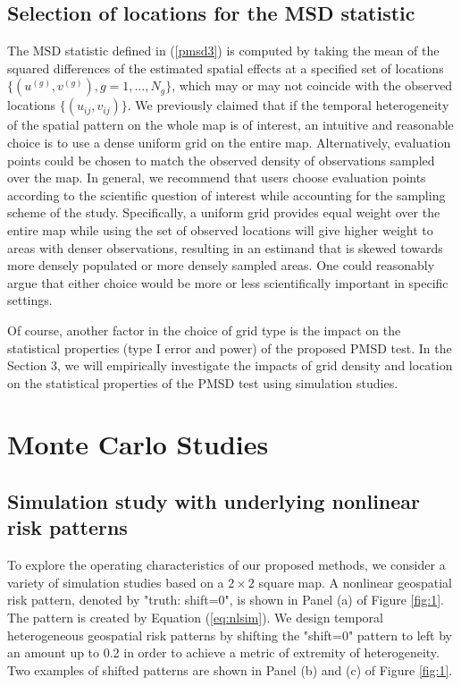 	\subsection{Selection of locations for the MSD statistic}\label{selection}
	The MSD statistic defined in (\ref{pmsd3}) is computed by taking the mean of the squared differences of the estimated spatial effects at a specified set of locations $\{(u^{(g)},v^{(g)}),g=1,\dots,N_g\}$, which may or may not coincide with the observed locations $\{(u_{ij},v_{ij})\}$.  We previously claimed that if the temporal heterogeneity of the spatial pattern on the whole map is of interest, an intuitive and reasonable choice is to use a dense uniform grid on the entire map. Alternatively, evaluation points could be chosen to match the observed density of observations sampled over the map. In general, we recommend that users choose evaluation points according to the scientific question of interest while accounting for the sampling scheme of the study. Specifically, a uniform grid provides equal weight over the entire map while using the set of observed locations will give higher weight to areas with denser observations, resulting in an estimand that is skewed towards more densely populated or more densely sampled areas. One could reasonably argue that either choice would be more or less scientifically important in specific settings.
	
	Of course, another factor in the choice of grid type is the impact on the statistical properties (type I error and power) of the proposed PMSD test. In the Section 3, we will empirically investigate the impacts of grid density and location on the statistical properties of the PMSD test using simulation studies.
	
	\section{Monte Carlo Studies}
	
	\subsection{Simulation study with underlying nonlinear risk patterns} \label{simulation_nonlinear}
	To explore the operating characteristics of our proposed methods, we consider a variety of simulation studies based on a $2\times 2$ square map. A nonlinear geospatial risk pattern, denoted by "truth: shift=0", is shown in Panel (a) of Figure \ref{fig:1}. The pattern is created by Equation (\ref{eq:nlsim}). We design temporal heterogeneous  geospatial risk patterns by shifting the "shift=0" pattern to left by an amount up to 0.2 in order to achieve a metric of extremity of heterogeneity. Two examples of shifted patterns are shown in Panel (b) and (c) of Figure \ref{fig:1}. 
	
